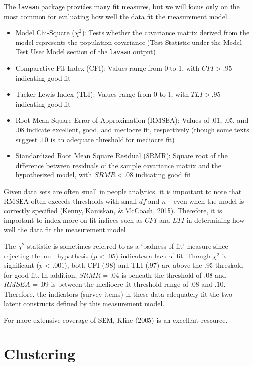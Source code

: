 \documentclass[
]{book}
\providecommand{\tightlist}{%
  \setlength{\itemsep}{0pt}\setlength{\parskip}{0pt}}
\begin{document}
The \texttt{lavaan} package provides many fit measures, but we will focus only on the most common for evaluating how well the data fit the measurement model.

\begin{itemize}
\tightlist
\item
  Model Chi-Square (\(\chi^2\)): Tests whether the covariance matrix derived from the model represents the population covariance (Test Statistic under the Model Test User Model section of the \texttt{lavaan} output)
\item
  Comparative Fit Index (CFI): Values range from 0 to 1, with \(CFI > .95\) indicating good fit
\item
  Tucker Lewis Index (TLI): Values range from 0 to 1, with \(TLI > .95\) indicating good fit
\item
  Root Mean Square Error of Approximation (RMSEA): Values of \(.01\), \(.05\), and \(.08\) indicate excellent, good, and mediocre fit, respectively (though some texts suggest \(.10\) is an adequate threshold for mediocre fit)
\item
  Standardized Root Mean Square Residual (SRMR): Square root of the difference between residuals of the sample covariance matrix and the hypothesized model, with \(SRMR < .08\) indicating good fit
\end{itemize}

Given data sets are often small in people analytics, it is important to note that RMSEA often exceeds thresholds with small \(df\) and \(n\) -- even when the model is correctly specified (Kenny, Kaniskan, \& McCoach, 2015). Therefore, it is important to index more on fit indices such as \(CFI\) and \(LTI\) in determining how well the data fit the measurement model.

The \(\chi^2\) statistic is sometimes referred to as a `badness of fit' measure since rejecting the null hypothesis (\(p\) \textless{} .05) indicates a lack of fit. Though \(\chi^2\) is significant (\(p\) \textless{} .001), both CFI (\(.98\)) and TLI (\(.97\)) are above the \(.95\) threshold for good fit. In addition, \(SRMR\) = .04 is beneath the threshold of \(.08\) and \(RMSEA\) = .09 is between the mediocre fit threshold range of \(.08\) and \(.10\). Therefore, the indicators (survey items) in these data adequately fit the two latent constructs defined by this measurement model.

For more extensive coverage of SEM, Kline (2005) is an excellent resource.

\hypertarget{clustering}{%
\section{Clustering}\label{clustering}}
\end{document}
